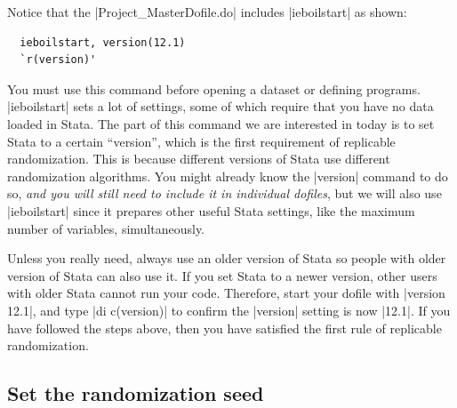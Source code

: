 \documentclass{tufte-handout}
\begin{document}
Notice that the |Project_MasterDofile.do| includes |ieboilstart| as shown:
\begin{Verbatim}
  ieboilstart, version(12.1)
  `r(version)'
\end{Verbatim}
You must use this command before opening a dataset or defining programs.
|ieboilstart| sets a lot of settings,
some of which require that you have no data loaded in Stata.
The part of this command we are interested in today is
to set Stata to a certain “version”,
which is the first requirement of replicable randomization.
This is because different versions of Stata use different randomization algorithms.
You might already know the |version| command to do so,
\textit{and you will still need to include it in individual dofiles},
but we will also use |ieboilstart| since it prepares
other useful Stata settings, like the maximum number of variables, simultaneously.


Unless you really need, always use an older version
of Stata so people with older version of Stata can also use it.
If you set Stata to a newer
version, other users with older Stata cannot run your code.
Therefore, start your dofile with |version 12.1|, and
type |di c(version)| to confirm the |version| setting is now |12.1|.
If you have followed the steps above,
then you have satisfied the first rule of replicable randomization.

\subsection{Set the randomization seed}
\end{document}
